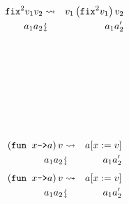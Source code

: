 \documentclass{beamer}
\newcommand{\assign}{:=}
\newcommand{\downsquigarrow}{{\mbox{\rotatebox[origin=c]{-90}{$\rightsquigarrow$}}}}
\newcommand{\tmverbatim}[1]{\text{{\ttfamily{#1}}}}
\begin{document}
{\newpage}
\begin{eqnarray*}
  \text{\tmverbatim{fix}}^2 v_1 v_2 & \rightsquigarrow & v_1  \left(
  \text{\tmverbatim{fix}}^2 v_1 \right) v_2\\
  a_1 a_2 & \downsquigarrow & a_1 a_2'
\end{eqnarray*}
{\hlstd{ \ }}{}{\hlopt{+ }}{\hlopt{(}}{}{}{\hlopt{->}}{\hlendline{}}\\
{\hlstd{ \ \ \ \ \ }} \ \ {}{}{}{\hlendline{}}\\
{\hlstd{ \ \ \ \ \ \ \ \ \ }}{\hlopt{\textbar }}{}{\hlopt{->
}}{}{\hlendline{}}\\
{\hlstd{ \ \ \ }}{\hlopt{ \ \ \ \ \ \textbar }}{}{\hlopt{(}}{}{\hlopt{, }}{}{\hlopt{) -> }}{}{\hlopt{+ }}{}{\hlopt{))}}\\
{\hlopt{ \ \ \ \ \ \ \ (}}{}{\hlopt{(}}{}{}{\hlopt{->}}{\hlendline{}}\\
{\hlstd{ \ \ \ \ \ }}{}{}{}{\hlendline{}}\\
{\hlstd{ \ \ \ \ \ \ \ }}{\hlopt{ \ \ \ \ \textbar }}{}{\hlopt{->
}}{}{\hlendline{}}\\
{\hlstd{ \ \ \ }}{\hlopt{ \ \ \ \ \ \ \ \ \textbar }}{}{\hlopt{(}}{}{\hlopt{, }}{}{\hlopt{) -> }}{}{\hlopt{+ }}{}{\hlopt{))}}{\hlopt{ (}}{}{\hlopt{(}}{}{\hlopt{, }}{}{\hlopt{))}}
\begin{eqnarray*}
  \left( \text{\tmverbatim{fun }} x \text{\tmverbatim{->}} a \right) v &
  \rightsquigarrow & a [x \assign v]\\
  a_1 a_2 & \downsquigarrow & a_1 a_2'
\end{eqnarray*}
{\newpage}
\begin{eqnarray*}
  \left( \text{\tmverbatim{fun }} x \text{\tmverbatim{->}} a \right) v &
  \rightsquigarrow & a [x \assign v]\\
  a_1 a_2 & \downsquigarrow & a_1 a_2'
\end{eqnarray*}
{\hlstd{ \ }}{}{\hlopt{+ }}{\hlopt{(}}{}{}{\hlopt{->}}{\hlendline{}}\\
{\hlstd{ \ \ \ \ \ }} \ \ {}{}{}{\hlendline{}}\\
{\hlstd{ \ \ \ \ \ \ \ \ \ }}{\hlopt{\textbar }}{}{\hlopt{->
}}{}{\hlendline{}}\\
\end{document}
